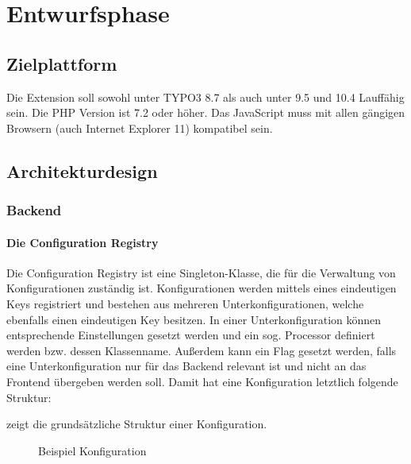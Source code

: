 \section{Entwurfsphase} 
\label{sec:Entwurfsphase}

\subsection{Zielplattform}
\label{sec:Zielplattform}

Die Extension soll sowohl unter TYPO3 8.7 als auch unter 9.5 und 10.4 Lauffähig sein. Die PHP Version ist 7.2 oder höher. Das JavaScript muss mit allen gängigen Browsern (auch Internet Explorer 11) kompatibel sein.


\subsection{Architekturdesign}
\label{sec:Architekturdesign}

\subsubsection{Backend}
\label{sec:Backend}

\paragraph{Die Configuration Registry} Die Configuration Registry ist eine Singleton-Klasse, die für die Verwaltung von Konfigurationen zuständig ist. Konfigurationen werden mittels eines eindeutigen Keys registriert und bestehen aus mehreren Unterkonfigurationen, welche ebenfalls einen eindeutigen Key besitzen. In einer Unterkonfiguration können entsprechende Einstellungen gesetzt werden und ein sog. Processor definiert werden bzw. dessen Klassenname. Außerdem kann ein Flag gesetzt werden, falls eine Unterkonfiguration nur für das Backend relevant ist und nicht an das Frontend übergeben werden soll. Damit hat eine Konfiguration letztlich folgende Struktur:

\pagebreak

 zeigt die grundsätzliche Struktur einer Konfiguration.
\begin{figure}[htb]
\centering
{}
\caption{Beispiel Konfiguration}
\label{fig:beispiel_konfiguration}
\end{figure}

